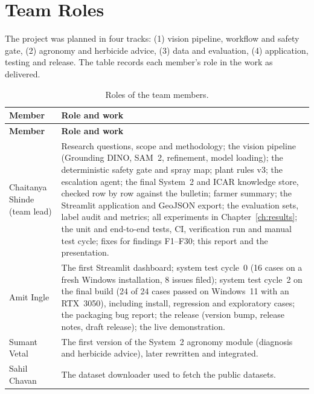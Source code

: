 \chapter{Team Roles}\label{app:contrib}
The project was planned in four tracks: (1) vision pipeline, workflow and safety gate, (2) agronomy and
herbicide advice, (3) data and evaluation, (4) application, testing and release. The table records
each member's role in the work as delivered.

\begin{small}
\begin{longtable}{@{}L{3.2cm}L{11.2cm}@{}}
\caption{Roles of the team members.}\label{tab:roles}\\
\toprule
\textbf{Member} & \textbf{Role and work}\\
\midrule\endfirsthead
\toprule
\textbf{Member} & \textbf{Role and work}\\
\midrule\endhead
Chaitanya Shinde (team lead) & Research questions, scope and methodology; the vision pipeline (Grounding DINO, SAM~2, refinement, model loading); the deterministic safety gate and spray map; plant rules v3; the escalation agent; the final System~2 and ICAR knowledge store, checked row by row against the bulletin; farmer summary; the Streamlit application and GeoJSON export; the evaluation sets, label audit and metrics; all experiments in Chapter~\ref{ch:results}; the unit and end-to-end tests, CI, verification run and manual test cycle; fixes for findings F1--F30; this report and the presentation.\\[4pt]
Amit Ingle & The first Streamlit dashboard; system test cycle~0 (16 cases on a fresh Windows installation, 8 issues filed); system test cycle~2 on the final build (24 of 24 cases passed on Windows~11 with an RTX~3050), including install, regression and exploratory cases; the packaging bug report; the  release (version bump, release notes, draft release); the live demonstration.\\[4pt]
Sumant Vetal & The first version of the System~2 agronomy module (diagnosis and herbicide advice), later rewritten and integrated.\\[4pt]
Sahil Chavan & The dataset downloader used to fetch the public datasets.\\
\bottomrule
\end{longtable}
\end{small}
